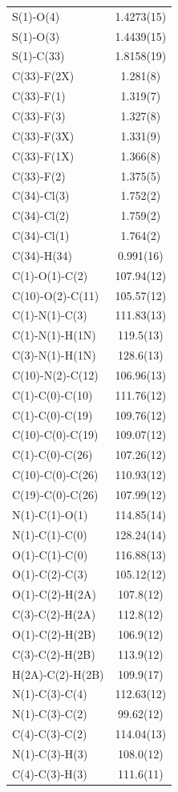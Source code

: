 \begin{center}
{\begin{supertabular}{p{1.5in}c}
S(1)-O(4) &1.4273(15)\\
S(1)-O(3) &1.4439(15)\\
S(1)-C(33) &1.8158(19)\\
C(33)-F(2X) &1.281(8)\\
C(33)-F(1) &1.319(7)\\
C(33)-F(3) &1.327(8)\\
C(33)-F(3X) &1.331(9)\\
C(33)-F(1X) &1.366(8)\\
C(33)-F(2) &1.375(5)\\
C(34)-Cl(3) &1.752(2)\\
C(34)-Cl(2) &1.759(2)\\
C(34)-Cl(1) &1.764(2)\\
C(34)-H(34) &0.991(16)\\
C(1)-O(1)-C(2)&107.94(12)\\
C(10)-O(2)-C(11)&105.57(12)\\
C(1)-N(1)-C(3)&111.83(13)\\
C(1)-N(1)-H(1N)&119.5(13)\\
C(3)-N(1)-H(1N)&128.6(13)\\
C(10)-N(2)-C(12)&106.96(13)\\
C(1)-C(0)-C(10)&111.76(12)\\
C(1)-C(0)-C(19)&109.76(12)\\
C(10)-C(0)-C(19)&109.07(12)\\
C(1)-C(0)-C(26)&107.26(12)\\
C(10)-C(0)-C(26)&110.93(12)\\
C(19)-C(0)-C(26)&107.99(12)\\
N(1)-C(1)-O(1)&114.85(14)\\
N(1)-C(1)-C(0)&128.24(14)\\
O(1)-C(1)-C(0)&116.88(13)\\
O(1)-C(2)-C(3)&105.12(12)\\
O(1)-C(2)-H(2A)&107.8(12)\\
C(3)-C(2)-H(2A)&112.8(12)\\
O(1)-C(2)-H(2B)&106.9(12)\\
C(3)-C(2)-H(2B)&113.9(12)\\
H(2A)-C(2)-H(2B)&109.9(17)\\
N(1)-C(3)-C(4)&112.63(12)\\
N(1)-C(3)-C(2)&99.62(12)\\
C(4)-C(3)-C(2)&114.04(13)\\
N(1)-C(3)-H(3)&108.0(12)\\
C(4)-C(3)-H(3)&111.6(11)\\

\end{supertabular}}
\end{center}
